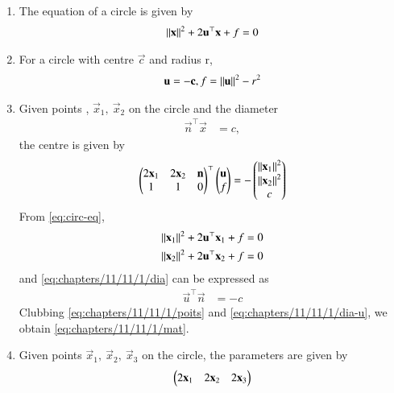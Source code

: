 \begin{enumerate}[label=\thesubsection.\arabic*.,ref=\thesubsection.\theenumi]
	\item The equation of a circle is given by 
	\label{prop:circ-eq}
\begin{align}
	\left\lVert\mathbf{x}\right\rVert^2 + 2 \mathbf{u}^{\top}\mathbf{x} + f = 0
	\label{eq:circ-eq}
\end{align}
\item For a circle with centre $\vec{c}$ and radius r,
\begin{align}
	\mathbf{u} = -\mathbf{c}, f = \left\lVert\mathbf{u}\right\rVert^2 - r^2
	\label{eq:circ-cr}
\end{align}
\item Given  points
\label{prop:chapters/11/11/1/pts},
	$\vec{x}_{1},\  \vec{x}_{2} $
on the circle and the diameter
\begin{align}
	\vec{n}^\top \vec{x} &= c,
	\label{eq:chapters/11/11/1/dia}
\end{align}
the centre is given by
\begin{align}
\begin{pmatrix}
 2 \mathbf{x}_1 & 2 \mathbf{x}_2 & \mathbf{n}
 \\
 1 & 1 & 0
 \end{pmatrix}^\top 
	\begin{pmatrix}\mathbf{u} \\ f\end{pmatrix}
	=
-\begin{pmatrix} 	\left\lVert\mathbf{x}_1\right\rVert^2 
\\
 	\left\lVert\mathbf{x}_2\right\rVert^2 	
	\\
	c     
	\end{pmatrix}
	\label{eq:chapters/11/11/1/mat}
                     \end{align}
\solution
	From 
	\eqref{eq:circ-eq},
\begin{align}
\begin{split}
	\left\lVert\mathbf{x}_1\right\rVert^2 + 2 \mathbf{u}^{\top}\mathbf{x}_1 + f = 0
	\\
	\left\lVert\mathbf{x}_2\right\rVert^2 + 2 \mathbf{u}^{\top}\mathbf{x}_2 + f = 0
\end{split}
	\label{eq:chapters/11/11/1/poits}
\end{align}
and 
	\eqref{eq:chapters/11/11/1/dia}
	can be expressed as
\begin{align}
	\vec{u}^\top \vec{n} &= -c
	\label{eq:chapters/11/11/1/dia-u}
\end{align}
Clubbing 
	\eqref{eq:chapters/11/11/1/poits}
	and 
	\eqref{eq:chapters/11/11/1/dia-u},
	we obtain 
	\eqref{eq:chapters/11/11/1/mat}.
\item Given  points
\label{prop:chapters/11/11/1/pts-3}
	$\vec{x}_{1},\  \vec{x}_{2},\ 
	\vec{x}_{3} $
on the circle, 
the parameters are given by
\begin{align}
\begin{pmatrix}
 2 \mathbf{x}_1 & 2 \mathbf{x}_2 & 2\mathbf{x}_3
 \\
\end{pmatrix}
\end{align}
\end{enumerate}
